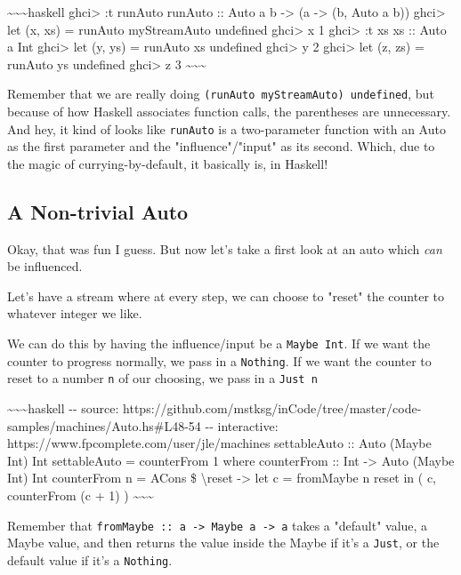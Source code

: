 \documentclass[]{article}
\begin{document}
\textasciitilde{}\textasciitilde{}\textasciitilde{}haskell ghci\textgreater{} :t
runAuto runAuto :: Auto a b -\textgreater{} (a -\textgreater{} (b, Auto a b))
ghci\textgreater{} let (x, xs) = runAuto myStreamAuto undefined
ghci\textgreater{} x 1 ghci\textgreater{} :t xs xs :: Auto a Int
ghci\textgreater{} let (y, ys) = runAuto xs undefined ghci\textgreater{} y 2
ghci\textgreater{} let (z, zs) = runAuto ys undefined ghci\textgreater{} z 3
\textasciitilde{}\textasciitilde{}\textasciitilde{}

Remember that we are really doing \texttt{(runAuto\ myStreamAuto)\ undefined},
but because of how Haskell associates function calls, the parentheses are
unnecessary. And hey, it kind of looks like \texttt{runAuto} is a two-parameter
function with an Auto as the first parameter and the "influence"/"input" as its
second. Which, due to the magic of currying-by-default, it basically is, in
Haskell!

\subsection{A Non-trivial Auto}

Okay, that was fun I guess. But now let's take a first look at an auto which
\emph{can} be influenced.

Let's have a stream where at every step, we can choose to "reset" the counter to
whatever integer we like.

We can do this by having the influence/input be a \texttt{Maybe\ Int}. If we
want the counter to progress normally, we pass in a \texttt{Nothing}. If we want
the counter to reset to a number \texttt{n} of our choosing, we pass in a
\texttt{Just\ n}

\textasciitilde{}\textasciitilde{}\textasciitilde{}haskell -\/- source:
https://github.com/mstksg/inCode/tree/master/code-samples/machines/Auto.hs\#L48-54
-\/- interactive: https://www.fpcomplete.com/user/jle/machines settableAuto ::
Auto (Maybe Int) Int settableAuto = counterFrom 1 where counterFrom :: Int
-\textgreater{} Auto (Maybe Int) Int counterFrom n = ACons \$
\textbackslash{}reset -\textgreater{} let c = fromMaybe n reset in ( c,
counterFrom (c + 1) ) \textasciitilde{}\textasciitilde{}\textasciitilde{}

Remember that
\texttt{fromMaybe\ ::\ a\ -\textgreater{}\ Maybe\ a\ -\textgreater{}\ a} takes a
"default" value, a Maybe value, and then returns the value inside the Maybe if
it's a \texttt{Just}, or the default value if it's a \texttt{Nothing}.
\end{document}
